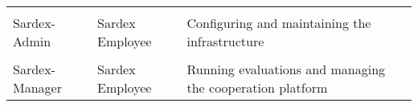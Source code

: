 \begin{longtable}[]{@{}lll@{}}
\tabularnewline
\tabularnewline
\begin{minipage}[t]{0.18\columnwidth}Sardex-Admin \end{minipage} &
\begin{minipage}[t]{0.37\columnwidth}Sardex Employee \end{minipage} &
\begin{minipage}[t]{0.37\columnwidth}Configuring and maintaining the infrastructure\end{minipage}
\tabularnewline
\tabularnewline
\begin{minipage}[t]{0.18\columnwidth}Sardex-Manager \end{minipage} &
\begin{minipage}[t]{0.37\columnwidth}Sardex Employee \end{minipage} &
\begin{minipage}[t]{0.37\columnwidth}Running evaluations and managing the cooperation platform \end{minipage}
\tabularnewline


\bottomrule
\end{longtable}









